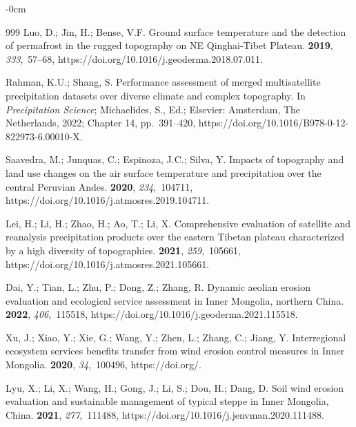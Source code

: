 \documentclass[geosciences,article,accept,pdftex,oneauthor]{Definitions/mdpi}
\begin{document}
\begin{adjustwidth}{-\extralength}{0cm}
\begin{thebibliography}{999}
Luo, D.; Jin, H.; Bense, V.F.
\newblock Ground surface temperature and the detection of permafrost in the
  rugged topography on NE Qinghai-Tibet Plateau.
 {\bf 2019}, {\em 333},~57--68, https://doi.org/10.1016/j.geoderma.2018.07.011.

Rahman, K.U.; Shang, S.
\newblock  Performance assessment of merged multisatellite
  precipitation datasets over diverse climate and complex topography. In {\em
  Precipitation Science}; Michaelides, S., Ed.; Elsevier: Amsterdam, The Netherlands,
  2022; Chapter 14, pp.~391--420, https://doi.org/10.1016/B978-0-12-822973-6.00010-X.

Saavedra, M.; Junquas, C.; Espinoza, J.C.; Silva, Y.
\newblock Impacts of topography and land use changes on the air surface
  temperature and precipitation over the central Peruvian Andes.
 {\bf 2020}, {\em 234},~104711, https://doi.org/10.1016/j.atmosres.2019.104711.

Lei, H.; Li, H.; Zhao, H.; Ao, T.; Li, X.
\newblock Comprehensive evaluation of satellite and reanalysis precipitation
  products over the eastern Tibetan plateau characterized by a high diversity
  of topographies.
 {\bf 2021}, {\em 259},~105661, https://doi.org/10.1016/j.atmosres.2021.105661.

Dai, Y.; Tian, L.; Zhu, P.; Dong, Z.; Zhang, R.
\newblock Dynamic aeolian erosion evaluation and ecological service assessment
  in Inner Mongolia, northern China.
 {\bf 2022}, {\em 406},~115518, https://doi.org/10.1016/j.geoderma.2021.115518.

Xu, J.; Xiao, Y.; Xie, G.; Wang, Y.; Zhen, L.; Zhang, C.; Jiang, Y.
\newblock Interregional ecosystem services benefits transfer from wind erosion
  control measures in Inner Mongolia.
 {\bf 2020}, {\em 34},~100496,
  https://doi.org/{\href{https://doi.org/10.1016/j.envdev.2020.100496}{}}.

Lyu, X.; Li, X.; Wang, H.; Gong, J.; Li, S.; Dou, H.; Dang, D.
\newblock Soil wind erosion evaluation and sustainable management of typical
  steppe in Inner Mongolia, China.
 {\bf 2021}, {\em
  277},~111488, https://doi.org/10.1016/j.jenvman.2020.111488.


\end{thebibliography}
\end{adjustwidth}
\end{document}

